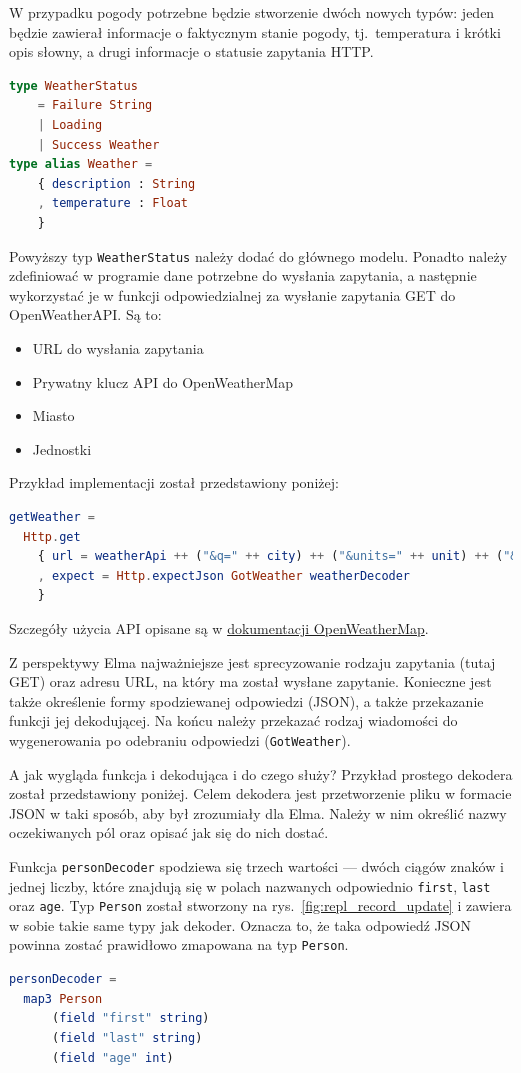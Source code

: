 \documentclass[twoside,a4paper]{report}
\begin{document}
W przypadku pogody potrzebne będzie stworzenie dwóch nowych typów: jeden będzie zawierał informacje o faktycznym stanie pogody, tj.~temperatura i krótki opis słowny, a drugi informacje o statusie zapytania HTTP\@.

\begin{lstlisting}[language=Elm]
type WeatherStatus
    = Failure String
    | Loading
    | Success Weather
type alias Weather =
    { description : String
    , temperature : Float
    }
\end{lstlisting}

Powyższy typ \texttt{WeatherStatus} należy dodać do głównego modelu.
Ponadto należy zdefiniować w programie dane potrzebne do wysłania zapytania, a następnie wykorzystać je w funkcji odpowiedzialnej za wysłanie zapytania GET do OpenWeatherAPI\@.
Są to:
\begin{itemize}[noitemsep,topsep=0pt]
    \item URL do wysłania zapytania
    \item Prywatny klucz API do OpenWeatherMap
    \item Miasto
    \item Jednostki
\end{itemize}
Przykład implementacji został przedstawiony poniżej:

\begin{lstlisting}[language=Elm]
getWeather =
  Http.get
    { url = weatherApi ++ ("&q=" ++ city) ++ ("&units=" ++ unit) ++ ("&appid=" ++ apiKey)
    , expect = Http.expectJson GotWeather weatherDecoder
    }
\end{lstlisting}
Szczegóły użycia API opisane są w \href{https://openweathermap.org/current#name}{dokumentacji OpenWeatherMap}.

Z perspektywy Elma najważniejsze jest sprecyzowanie rodzaju zapytania (tutaj GET) oraz adresu URL, na który ma został wysłane zapytanie.
Konieczne jest także określenie formy spodziewanej odpowiedzi (JSON), a także przekazanie funkcji jej dekodującej.
Na końcu należy przekazać rodzaj wiadomości do wygenerowania po odebraniu odpowiedzi (\texttt{GotWeather}).

A jak wygląda funkcja i dekodująca i do czego służy?
Przykład prostego dekodera został przedstawiony poniżej.
Celem dekodera jest przetworzenie pliku w formacie JSON w taki sposób, aby był zrozumiały dla Elma.
Należy w nim określić nazwy oczekiwanych pól oraz opisać jak się do nich dostać.

Funkcja \texttt{personDecoder} spodziewa się trzech wartości --- dwóch ciągów znaków i jednej liczby, które znajdują się w polach nazwanych odpowiednio \texttt{first}, \texttt{last} oraz \texttt{age}.
Typ \texttt{Person} został stworzony na rys.~\ref{fig:repl_record_update} i zawiera w sobie takie same typy jak dekoder.
Oznacza to, że taka odpowiedź JSON powinna zostać prawidłowo zmapowana na typ \texttt{Person}.
\begin{lstlisting}[language=Elm]
personDecoder =
  map3 Person
      (field "first" string)
      (field "last" string)
      (field "age" int)
\end{lstlisting}
\end{document}
